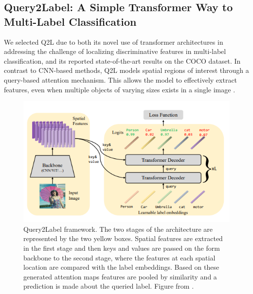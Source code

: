 \documentclass[lettersize,journal]{IEEEtran}
\begin{document}
\subsection{Query2Label: A Simple Transformer Way to Multi-Label Classification}
\label{sec:q2l_method}
We selected Q2L \cite{Query2Label} due to both its novel use of transformer architectures in addressing the challenge of localizing discriminative features in multi-label classification, and its reported state-of-the-art results on the COCO dataset. In contrast to CNN-based methods, Q2L models spatial regions of interest through a query-based attention mechanism. This allows the model to effectively extract features, even when multiple objects of varying sizes exists in a single image \cite{Query2Label}.

\begin{figure}[t]
    \centering
    \includegraphics[width=.8\linewidth]{images/q2l_framework.PNG}
    \caption{Query2Label framework. The two stages of the architecture are represented by the two yellow boxes. Spatial features are extracted in the first stage and then keys and values are passed on the form backbone to the second stage, where the features at each spatial location are compared with the label embeddings. Based on these generated attention maps features are pooled by similarity and a prediction is made about the queried label. Figure from \cite{Query2Label}.}
    \label{fig:q2l_framework}
\end{figure}

\end{document}
